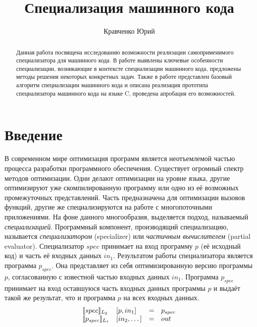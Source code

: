 \lstset{escapechar=@,style=mycode}

\title{Специализация машинного кода}


\author{Кравченко Юрий}



\maketitle

\begin{abstract}
Данная работа посвящена исследованию возможности реализации самоприменимого специализатора для
машинного кода.
В работе выявлены ключевые особенности специализации, возникающие в контексте специализации машинного
кода, предложены методы решения некоторых конкретных задач.
Также в работе представлен базовый алгоритм специализации машинного кода и
описана реализация прототипа специализатора машинного кода на языке \textsf{C},
проведена апробация его возможностей.
\end{abstract}


\section*{Введение}
В современном мире оптимизация программ является неотъемлемой частью процесса разработки программного обеспечения. Существует огромный спектр методов оптимизации.
Одни делают оптимизации на уровне языка, другие оптимизируют уже скомпилированную программу или одно из её возможных промежуточных
представлений.
Часть предназначена для оптимизации вызовов функций, другие же специализируются на работе с многопоточными приложениями.
На фоне данного многообразия, выделяется подход, называемый \emph{специализацией}.
Программный компонент, производящий специализацию, называется \emph{специализатором} (specializer) или
\emph{частичным вычислителем} (partial evaluator).
Специализатор $spec$ принимает на вход программу $p$ (её исходный код) и часть её входных данных $in_1$.
Результатом работы специализатора является программа $p_{spec}$.
Она представляет из себя оптимизированную версию программы $p$, согласованную с известной частью входных данных $in_1$.
Программа $p_{spec}$ принимает на вход оставшуюся часть входных данных программы $p$ и выдаёт такой же результат,
что и программа $p$ на всех входных данных. 
$$\begin{array}{l l c l}
    \llbracket spec \rrbracket_{L_2} & [p, in_1] &= &p_{spec}\\
    \llbracket p_{spec} \rrbracket_{L_1} & [in_2 ,\dots] &= &out
  \end{array}$$
      
